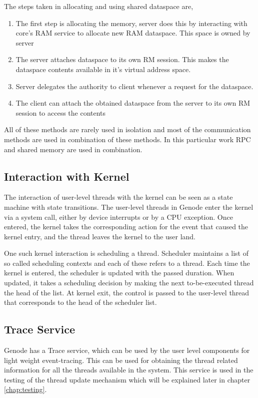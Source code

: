 The steps taken in allocating and using shared dataspace are,
\begin{enumerate}
\item The first step is allocating the memory, server does this by interacting with core's RAM service to allocate new RAM dataspace. This space is owned by server

\item The server attaches dataspace to its own RM session. This makes the dataspace contents available in it's virtual address space.

\item Server delegates the authority to client whenever a request for the dataspace.

\item The client can attach the obtained dataspace from the server to its own RM session to access the contents
\end{enumerate}

All of these methods are rarely used in isolation and most of the communication methods are used in combination of these methods. In this particular work RPC and shared memory are used in combination.

\subsection{Interaction with Kernel}
The interaction of user-level threads with the kernel can be seen as a state machine with state transitions. The user-level threads in Genode enter the kernel via a system call, either by device interrupts or by a CPU exception. Once entered, the kernel takes the corresponding action for the event that caused the kernel entry, and the thread leaves the kernel to the user land.

One such kernel interaction is scheduling a thread. Scheduler maintains a list of so called scheduling contexts and each of these refers to a thread. Each time the kernel is entered, the scheduler is updated with the passed duration. When updated, it takes a scheduling decision by making the next to-be-executed thread the head of the list. At kernel exit, the control is passed to the user-level thread that corresponds to the head of the scheduler list.

\subsection{Trace Service}
Genode has a Trace service, which can be used by the user level components for light weight event-tracing. This can be used for obtaining the thread related information for all the threads available in the system. This service is used in the testing of the thread update mechanism which will be explained later in chapter \ref{chap:testing}.

